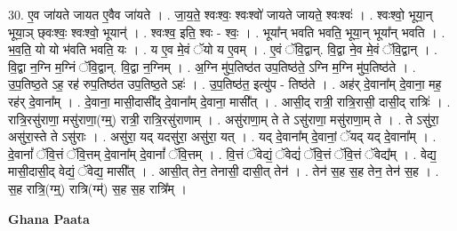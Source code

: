 \documentclass[17pt]{extarticle}
\begin{document}
30. ए॒व जा॑यते जायत ए॒वैव जा॑यते । . जा॒य॒ते॒ श्वःश्वः॒ श्वःश्वो॑ जायते जायते॒ श्वःश्वः॑ । . श्वःश्वो॒ भूया॒न् भूया॒ञ् छ्‌वःश्वः॒ श्वःश्वो॒ भूयान्॑ । . श्वःश्व॒ इति॒ श्वः - श्वः॒ । . भूया᳚न् भवति भवति॒ भूया॒न् भूया᳚न् भवति । . भ॒व॒ति॒ यो यो भ॑वति भवति॒ यः । . य ए॒व मे॒वं ॅयो य ए॒वम् । . ए॒वं ॅवि॒द्वान्. वि॒द्वा ने॒व मे॒वं ॅवि॒द्वान् । . वि॒द्वा न॒ग्नि म॒ग्निं ॅवि॒द्वान्. वि॒द्वा न॒ग्निम् । . अ॒ग्नि मु॑प॒तिष्ठ॑त उप॒तिष्ठ॑ते॒ ऽग्नि म॒ग्नि मु॑प॒तिष्ठ॑ते । . उ॒प॒तिष्ठ॒ते ऽह॒ रह॑ रुप॒तिष्ठ॑त उप॒तिष्ठ॒ते ऽहः॑ । . उ॒प॒तिष्ठ॑त॒ इत्यु॑प - तिष्ठ॑ते । . अह॑र् दे॒वाना᳚म् दे॒वाना॒ मह॒ रह॑र् दे॒वाना᳚म् । . दे॒वाना॒ मासी॒दासी᳚द् दे॒वाना᳚म् दे॒वाना॒ मासी᳚त् । . आसी॒द् रात्री॒ रात्रि॒रासी॒ दासी॒द् रात्रिः॑ । . रात्रि॒रसु॑राणा॒ मसु॑राणा॒(ग्म्॒) रात्री॒ रात्रि॒रसु॑राणाम् । . असु॑राणा॒म् ते ते ऽसु॑राणा॒ मसु॑राणा॒म् ते । . ते ऽसु॑रा॒ असु॑रा॒स्ते ते ऽसु॑राः । . असु॑रा॒ यद् यदसु॑रा॒ असु॑रा॒ यत् । . यद् दे॒वाना᳚म् दे॒वानां॒ ॅयद् यद् दे॒वाना᳚म् । . दे॒वानां᳚ ॅवि॒त्तं ॅवि॒त्तम् दे॒वाना᳚म् दे॒वानां᳚ ॅवि॒त्तम् । . वि॒त्तं ॅवेद्यं॒ ॅवेद्यं॑ ॅवि॒त्तं ॅवि॒त्तं ॅवेद्य᳚म् । . वेद्य॒ मासी॒दासी॒द् वेद्यं॒ ॅवेद्य॒ मासी᳚त् । . आसी॒त् तेन॒ तेनासी॒ दासी॒त् तेन॑ । . तेन॑ स॒ह स॒ह तेन॒ तेन॑ स॒ह । . स॒ह रात्रि॒(ग्म्॒) रात्रि(ग्म्॑) स॒ह स॒ह रात्रि᳚म् । \newline

\textbf{Ghana Paata } \newline
\end{document}
